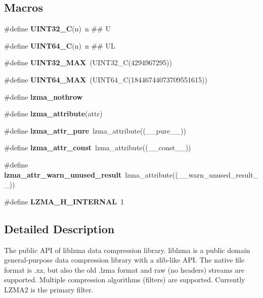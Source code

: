 \subsection*{Macros}
\begin{DoxyCompactItemize}
\item 
\#define {\bfseries U\-I\-N\-T32\-\_\-\-C}(n)~n \#\# U\label{lzma_8h_acecee981dc3f28418f54035e20d7e578}

\item 
\#define {\bfseries U\-I\-N\-T64\-\_\-\-C}(n)~n \#\# U\-L\label{lzma_8h_ac6548785b283106d4d7bfc7a4ef87fc4}

\item 
\#define {\bfseries U\-I\-N\-T32\-\_\-\-M\-A\-X}~(U\-I\-N\-T32\-\_\-\-C(4294967295))\label{lzma_8h_ab5eb23180f7cc12b7d6c04a8ec067fdd}

\item 
\#define {\bfseries U\-I\-N\-T64\-\_\-\-M\-A\-X}~(U\-I\-N\-T64\-\_\-\-C(18446744073709551615))\label{lzma_8h_a30654b4b67d97c42ca3f9b6052dda916}

\item 
\#define {\bfseries lzma\-\_\-nothrow}\label{lzma_8h_a55854429aba444dbb0bd8325fed4eece}

\item 
\#define {\bfseries lzma\-\_\-attribute}(attr)\label{lzma_8h_a246aa54bb4e735e1e3054e65b51a6ed8}

\item 
\#define {\bfseries lzma\-\_\-attr\-\_\-pure}~lzma\-\_\-attribute((\-\_\-\-\_\-pure\-\_\-\-\_\-))\label{lzma_8h_adbc570ea8654f0c96699e38249ac8032}

\item 
\#define {\bfseries lzma\-\_\-attr\-\_\-const}~lzma\-\_\-attribute((\-\_\-\-\_\-const\-\_\-\-\_\-))\label{lzma_8h_a0aaafb664f89a525ff22530d61704556}

\item 
\#define {\bfseries lzma\-\_\-attr\-\_\-warn\-\_\-unused\-\_\-result}~lzma\-\_\-attribute((\-\_\-\-\_\-warn\-\_\-unused\-\_\-result\-\_\-\-\_\-))\label{lzma_8h_af15e147fcd7986ec4dd82660aec2b695}

\item 
\#define {\bfseries L\-Z\-M\-A\-\_\-\-H\-\_\-\-I\-N\-T\-E\-R\-N\-A\-L}~1\label{lzma_8h_af828f75941ade54f8379bb847da37349}

\end{DoxyCompactItemize}


\subsection{Detailed Description}
The public A\-P\-I of liblzma data compression library. liblzma is a public domain general-\/purpose data compression library with a zlib-\/like A\-P\-I. The native file format is .xz, but also the old .lzma format and raw (no headers) streams are supported. Multiple compression algorithms (filters) are supported. Currently L\-Z\-M\-A2 is the primary filter.

